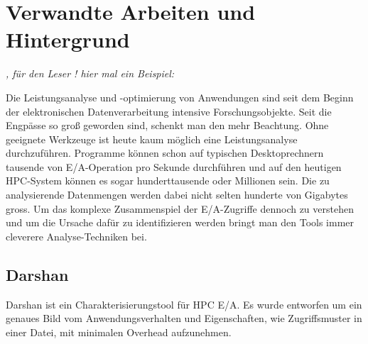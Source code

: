 

\newpage

\section{Verwandte Arbeiten und Hintergrund}
\textit{, für den Leser ! hier mal ein Beispiel:}




Die Leistungsanalyse und -optimierung von Anwendungen sind seit dem Beginn der elektronischen Datenverarbeitung intensive Forschungsobjekte. 
Seit die Engpässe  so groß geworden sind, schenkt man den mehr Beachtung. 
Ohne geeignete Werkzeuge ist heute kaum möglich eine Leistungsanalyse durchzuführen. 
Programme können schon auf typischen Desktoprechnern tausende von E/A-Operation pro Sekunde durchführen und auf den heutigen HPC-System können es sogar hunderttausende oder Millionen sein. 
Die zu analysierende Datenmengen werden dabei nicht selten hunderte von Gigabytes gross. 
Um das komplexe Zusammenspiel der E/A-Zugriffe dennoch zu verstehen und um die Ursache dafür zu identifizieren werden bringt man den Tools immer cleverere Analyse-Techniken bei.


\subsection{Darshan}
Darshan ist ein Charakterisierungstool für HPC E/A.
Es wurde entworfen um ein genaues Bild vom Anwendungsverhalten und Eigenschaften, wie Zugriffsmuster in einer Datei, mit minimalen  Overhead aufzunehmen.

